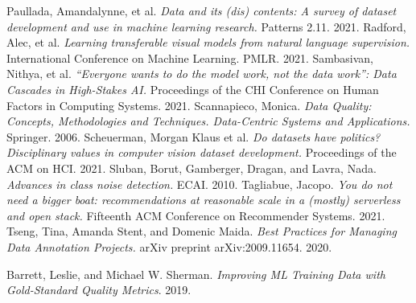 \documentclass[twocolumn]{article}
\begin{document}
\begin{thebibliography}{10}
 Paullada, Amandalynne, et al. {\em Data and its (dis) contents: A survey of dataset development and use in machine learning research.} Patterns 2.11. 2021.
 Radford, Alec, et al. {\em Learning transferable visual models from natural language supervision.} International Conference on Machine Learning. PMLR. 2021.
 Sambasivan, Nithya, et al. {\em ``Everyone wants to do the model work, not the data work'': Data Cascades in High-Stakes AI.} Proceedings of the CHI Conference on Human Factors in Computing Systems. 2021.
 Scannapieco, Monica. {\em Data Quality: Concepts, Methodologies and Techniques. Data-Centric Systems and Applications.} Springer. 2006.
 Scheuerman, Morgan Klaus et al. {\em Do datasets have politics? Disciplinary values in computer vision dataset development.} Proceedings of the ACM on HCI. 2021.
 Sluban, Borut, Gamberger, Dragan, and Lavra, Nada. {\em Advances in class noise detection.} ECAI. 2010.
 Tagliabue, Jacopo. {\em You do not need a bigger boat: recommendations at reasonable scale in a (mostly) serverless and open stack.} Fifteenth ACM Conference on Recommender Systems. 2021.
 Tseng, Tina, Amanda Stent, and Domenic Maida. {\em Best Practices for Managing Data Annotation Projects.} arXiv preprint arXiv:2009.11654. 2020.

 Barrett, Leslie, and Michael W. Sherman. {\em Improving ML Training Data with Gold-Standard Quality Metrics}. 2019.
  
\end{thebibliography}
\fi
\end{document}
